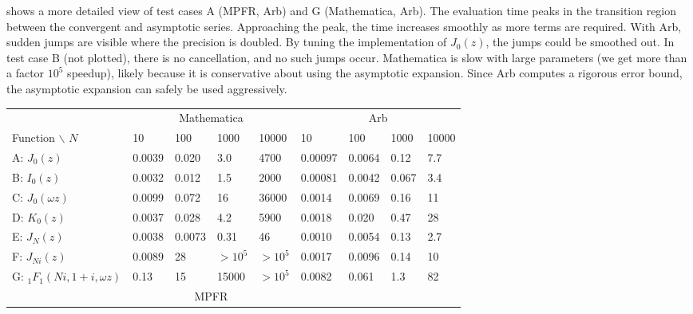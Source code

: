 \documentclass[11pt]{article}
\begin{document}
 shows a more detailed view of test cases A (MPFR, Arb) and G (Mathematica, Arb).
The evaluation time peaks in the transition region between the convergent and asymptotic series.
Approaching the peak, the time increases smoothly as more terms are required.
With Arb, sudden jumps are visible where the precision is doubled.
By tuning the implementation of $J_0(z)$, the jumps could be smoothed out.
In test case B (not plotted), there is no cancellation, and no such jumps occur.
Mathematica is slow with large parameters (we get more than a factor $10^5$ speedup),
likely because it is conservative about using the asymptotic expansion.
Since Arb computes a rigorous error bound, the asymptotic expansion
can safely be used aggressively.

\begin{table}
\renewcommand{\arraystretch}{1.4}
\setlength{\tabcolsep}{.4em}
\begin{center}
\begin{scriptsize}
\begin{tabular}{l | l l l l | l l l l}
                                  & \multicolumn{4}{|c|}{Mathematica} & \multicolumn{4}{|c}{Arb} \\
Function $\backslash$ $N$         &  10       & 100       & 1000 & 10000 &  10 & 100 & 1000 & 10000  \\ \hline
A: $J_0(z)$              &  0.0039   &  0.020    & 3.0     & 4700      &  0.00097   &  0.0064  &  0.12   &  7.7  \\
B: $I_0(z)$             &   0.0032   &  0.012    & 1.5     & 2000  &  0.00081   &  0.0042  &  0.067  &  3.4  \\
C: $J_0(\omega z)$      &   0.0099   &  0.072    & 16     & 36000      &  0.0014    &  0.0069  &  0.16   &  11   \\
D: $K_0(z)$             &   0.0037   &  0.028    & 4.2     &  5900  &  0.0018    &  0.020   &  0.47   &  28   \\
E: $J_N(z)$            &   0.0038   &  0.0073   & 0.31  &  46  &  0.0010    &  0.0054  &  0.13   &  2.7  \\
F: $J_{Ni}(z)$         &   0.0089   &  28       & $>10^5$     &   $>10^5$  &  0.0017    &  0.0096   &  0.14   &  10   \\
G: ${}_1F_1(Ni,1+i,\omega z)$     &   0.13     &  15       & 15000     &  $>10^5$   &  0.0082    &  0.061   &  1.3    &  82    \\ \hline
           &   \multicolumn{4}{|c|}{MPFR} & \multicolumn{4}{|c}{ } \\ \hline

\end{tabular}
\end{scriptsize}
\end{center}
\end{table}
\end{document}
